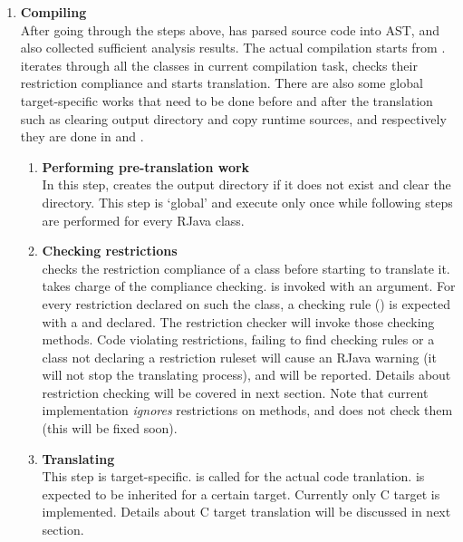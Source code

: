 \documentclass[12pt]{article}
\begin{document}
\begin{enumerate}
\begin{enumerate}
\begin{itemize}
    \end{itemize}
  \end{enumerate}

\item
\textbf{Compiling\\}
After going through the steps above, \rjc has parsed source code
into AST, and also collected sufficient analysis results. The actual
compilation starts from . 
\rjc iterates through
all the classes in current compilation task, checks their restriction compliance
and starts translation. There are also some global target-specific works that
need to be done before and after the translation such as clearing output directory
and copy runtime sources, and respectively they are done in 
 and
.

  \begin{enumerate}
  \item
  \textbf{Performing pre-translation work\\}
  In this step, \rjc creates the output directory if it does not exist
  and clear the directory. This step is `global' and execute
  only once while following steps are performed for every RJava
  class. 
  
  \item
  \textbf{Checking restrictions\\}
  \rjc checks the restriction compliance of a class before starting
  to translate it. 
  takes charge of the compliance checking.  is
  invoked with an  argument. For every restriction
   declared on such the class,
  a checking rule () is expected with a
   and  declared. 
  The restriction checker will invoke those checking methods. 
  Code violating restrictions, failing to find checking rules or 
  a class not declaring a restriction ruleset will cause an RJava warning
  (it will not stop the translating process), 
  and will be reported. Details about restriction checking will be
  covered in next section. Note that current implementation 
  \emph{ignores} restrictions on methods, and does not check them (this will be
  fixed soon). 
  
  \item
  \textbf{Translating\\}
  This step is target-specific.  is called for
  the actual code tranlation. 
   is expected to be inherited
  for a certain target. Currently only C target is implemented. 
  Details about C target translation will be discussed in next section. 
  

\end{enumerate}
\end{enumerate}
\end{document}
